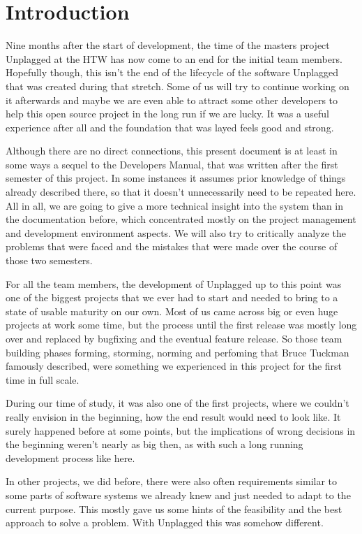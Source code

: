\chapter*{Introduction}

Nine months after the start of development, the time of the masters project Unplagged at the HTW has now come to an end for the 
initial team members. Hopefully though, 
this isn't the end of the lifecycle of the software Unplagged that was created during that stretch. Some of us will try to continue working on it afterwards and maybe we are even able to attract some other developers to help this open source project in the long run if we are lucky. It was a useful experience after all and the foundation that was layed feels good and strong.

Although there are no direct connections, this present document is at least in some ways a sequel to the Developers Manual, that was
written after the first semester of this project. In some instances it assumes prior knowledge of things already described there, so that it doesn't unnecessarily need to be repeated here.
All in all, we are going to give a more technical insight into the system than in the documentation before, which concentrated mostly
on the project management and development environment aspects. We will also try to critically 
analyze the problems that were faced and the mistakes that were made over the course of those
two semesters.

For all the team members, the development of Unplagged up to this point was one of 
the biggest 
projects that we ever had to start and needed to bring to a state of usable 
maturity on our own. Most of us came across big or even huge projects at work some time, but the process until 
the first release was mostly long over and replaced by bugfixing and the eventual feature release.
So those team building phases forming, storming, norming and perfoming that Bruce Tuckman famously described\citep{tuckman1965},
were something we experienced in this project for the first time in full scale.

During our time of study, it was also one of the first projects, 
where we couldn't really envision in the beginning, how the end result would need to look like. It surely happened before at some points, but the implications of wrong decisions in the beginning weren't nearly as big then, as with such a long running development process like here.

In other projects, we did before, there were also often requirements similar to some
parts of software systems we already knew and just needed to adapt to the current purpose.
This mostly gave us some hints of the feasibility and the best approach to solve a problem.
With Unplagged this was somehow different.

